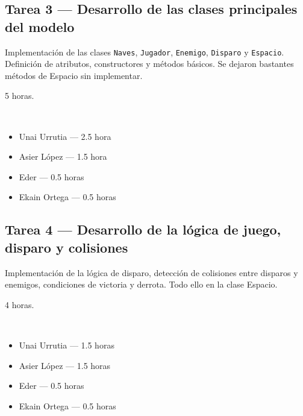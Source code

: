 \documentclass[12pt, a4paper]{article}
\begin{document}
\vspace{0.8em}

\subsection*{Tarea 3 — Desarrollo de las clases principales del modelo}
\begin{description}[leftmargin=2em, style=nextline]
    \item[\textbf{Descripción:}] Implementación de las clases \texttt{Naves}, \texttt{Jugador}, \texttt{Enemigo}, \texttt{Disparo} y \texttt{Espacio}. Definición de atributos, constructores y métodos básicos. Se dejaron bastantes métodos de Espacio sin implementar.
    \item[\textbf{Tiempo:}] 5 horas.
    \item[\textbf{Responsables y dedicación:}]~
        \begin{itemize}[leftmargin=1em, nosep]
            \item Unai Urrutia — 2.5 hora
            \item Asier López — 1.5 hora
            \item Eder — 0.5 horas
            \item Ekain Ortega — 0.5 horas
        \end{itemize}
\end{description}

\vspace{0.8em}

\subsection*{Tarea 4 — Desarrollo de la lógica de juego, disparo y colisiones}
\begin{description}[leftmargin=2em, style=nextline]
    \item[\textbf{Descripción:}] Implementación de la lógica de disparo, detección de colisiones entre disparos y enemigos, condiciones de victoria y derrota. Todo ello en la clase Espacio.
    \item[\textbf{Tiempo:}] 4 horas.
    \item[\textbf{Responsables y dedicación:}]~
        \begin{itemize}[leftmargin=1em, nosep]
            \item Unai Urrutia — 1.5 horas
            \item Asier López — 1.5 horas
            \item Eder — 0.5 horas
            \item Ekain Ortega — 0.5 horas
        \end{itemize}
\end{description}
\end{document}
